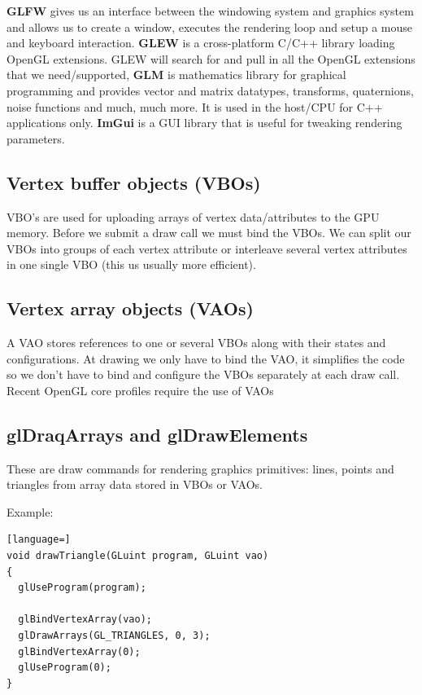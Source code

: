 \textbf{GLFW} gives us an interface between the windowing system and graphics system and allows us to create a window, executes the rendering loop and setup a mouse and keyboard interaction. \textbf{GLEW} is a cross-platform C/C++ library loading OpenGL extensions. GLEW will search for and pull in all the OpenGL extensions that we need/supported, \textbf{GLM} is mathematics library for graphical programming and provides vector and matrix datatypes, transforms, quaternions, noise functions and much, much more. It is used in the host/CPU for C++ applications only. \textbf{ImGui} is a GUI library that is useful for tweaking rendering parameters. 


\subsection*{Vertex buffer objects (VBOs)}
VBO's are used for uploading arrays of vertex data/attributes to the GPU memory. Before we submit a draw call we must bind the VBOs. We can split our VBOs into groups of each vertex attribute or interleave several vertex attributes in one single VBO (this us usually more efficient).

\subsection*{Vertex array objects (VAOs)}
A VAO stores references to one or several VBOs along with their states and configurations. At drawing we only have to bind the VAO, it simplifies the code so we don't have to bind and configure the VBOs separately at each draw call. Recent OpenGL core profiles require the use of VAOs


\subsection*{glDraqArrays and glDrawElements}
These are draw commands for rendering graphics primitives: lines, points and triangles from array data stored in VBOs or VAOs. 

\begin{example}{Example: }
\begin{lstlisting}[language=]
void drawTriangle(GLuint program, GLuint vao)
{
  glUseProgram(program);
 
  glBindVertexArray(vao);
  glDrawArrays(GL_TRIANGLES, 0, 3);
  glBindVertexArray(0);
  glUseProgram(0);
}
\end{lstlisting}

\end{example}	


